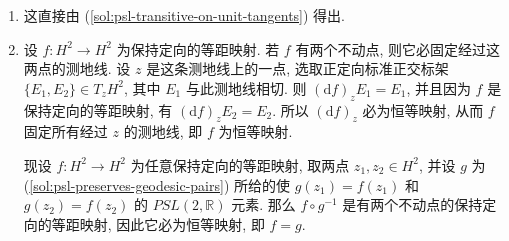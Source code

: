 \begin{description}[font=\normalfont,leftmargin=2em,labelwidth=1.5em]
\begin{enumerate}[label=(\alph*),ref=\alph*,leftmargin=*]
\[
  \begin{pmatrix}\sqrt{y_0}&\dfrac{x_0}{\sqrt{y_0}}\\[2pt]
                  0&\dfrac1{\sqrt{y_0}}\end{pmatrix}\in PSL(2,\mathbb{R}),
\]
并把 $i$ 送到 $z_0$. 此外, 与矩阵
\[
  \begin{pmatrix}\cos\theta&\sin\theta\\-\sin\theta&\cos\theta\end{pmatrix}\in PSL(2,\mathbb{R})
\]
对应的映射 $r_\theta:H^2\to H^2$ 固定 $i$ (即对每个 $\theta$ 有 $r_\theta(i)=i$), 且在 $i$ 处的向量上传递地作用, 因为
\[
  (\mathrm{d}r_\theta)_i=
  \begin{pmatrix}\cos(2\theta)&-\sin(2\theta)\\\sin(2\theta)&\cos(2\theta)\end{pmatrix}
\]
(它们在 $T_iH^2$ 上如 $SO(2)$ 一样作用). 因此映射 $g=f_q\circ r_\theta\circ f_p^{-1}$, 其中 $\theta$ 满足 $(\mathrm{d}r_\theta)_i(\mathrm{d}f_p^{-1})_pv=(\mathrm{d}f_q^{-1})_qw$, 把 $p$ 送到 $q$, 且使得 $(\mathrm{d}g)_pv=w$.
\item\label{sol:psl-preserves-geodesic-pairs} 这直接由 (\ref{sol:psl-transitive-on-unit-tangents}) 得出.
\item 设 $f:H^2\to H^2$ 为保持定向的等距映射. 若 $f$ 有两个不动点, 则它必固定经过这两点的测地线. 设 $z$ 是这条测地线上的一点, 选取正定向标准正交标架 $\{E_1,E_2\}\in T_zH^2$, 其中 $E_1$ 与此测地线相切. 则 $(\mathrm{d}f)_z E_1=E_1$, 并且因为 $f$ 是保持定向的等距映射, 有 $(\mathrm{d}f)_zE_2=E_2$. 所以 $(\mathrm{d}f)_z$ 必为恒等映射, 从而 $f$ 固定所有经过 $z$ 的测地线, 即 $f$ 为恒等映射.

现设 $f:H^2\to H^2$ 为任意保持定向的等距映射, 取两点 $z_1,z_2\in H^2$, 并设 $g$ 为 (\ref{sol:psl-preserves-geodesic-pairs}) 所给的使 $g(z_1)=f(z_1)$ 和 $g(z_2)=f(z_2)$ 的 $PSL(2,\mathbb{R})$ 元素. 那么 $f\circ g^{-1}$ 是有两个不动点的保持定向的等距映射, 因此它必为恒等映射, 即 $f=g$.
\end{enumerate}
\end{description}
